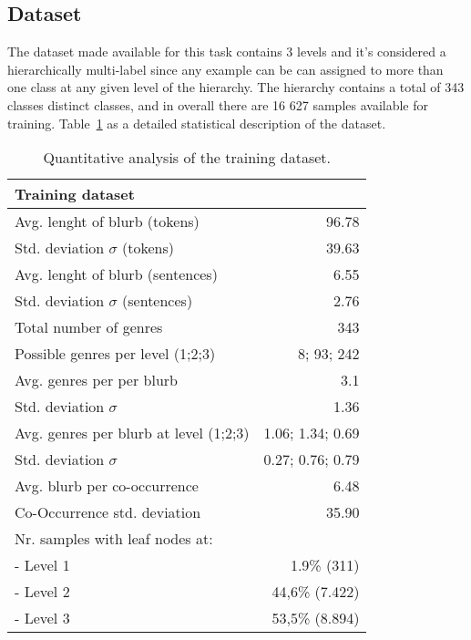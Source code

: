 \documentclass[11pt,a4paper]{article}
\begin{document}
\subsection{Dataset}

The dataset made available for this task contains 3 levels and it's considered a hierarchically
multi-label since any example can be can assigned to more than one class at any given level of
the hierarchy. The hierarchy contains a total of 343 classes distinct classes, and in overall there
are 16 627 samples available for training. Table~\ref{quantitivy-analysis-train} as a detailed statistical
description of the dataset.



\begin{table}
\small
\begin{center}
\begin{tabular}{|l|r|}
\hline\centering\textbf{Training dataset}  &                    \\
\hline
Avg. lenght of blurb (tokens)              &  96.78             \\
Std. deviation $\sigma$ (tokens)           &  39.63             \\
Avg. lenght of blurb (sentences)           &  6.55              \\
Std. deviation $\sigma$ (sentences)        &  2.76              \\
\hline
Total number of genres                     &  343               \\
Possible genres per level (1;2;3)          &  8; 93; 242        \\
Avg. genres per per blurb                  &  3.1               \\
Std. deviation $\sigma$                    &  1.36              \\
Avg. genres per blurb at level (1;2;3)     &  1.06; 1.34; 0.69  \\
Std. deviation $\sigma$                    &  0.27; 0.76; 0.79  \\
\hline
Avg. blurb per co-occurrence               &  6.48              \\
Co-Occurrence std. deviation               & 35.90              \\
\hline
Nr. samples with leaf nodes at:            &                    \\
 - Level 1                                 & 1.9\% (311)        \\
 - Level 2                                 & 44,6\% (7.422)     \\
 - Level 3                                 & 53,5\% (8.894)     \\
\hline
\end{tabular}
\end{center}
\caption{\label{quantitivy-analysis-train}Quantitative analysis of the training dataset.}
\end{table}
\end{document}
